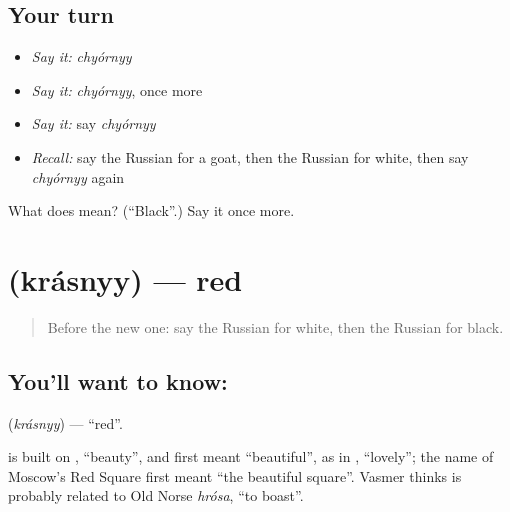 \subsection*{Your turn}
\begin{itemize}
\raggedright
  \item \emph{Say it:} \emph{chyórnyy}
  \item \emph{Say it:} \emph{chyórnyy}, once more
  \item \emph{Say it:} say \emph{chyórnyy}
  \item \emph{Recall:} say the Russian for a goat, then the Russian for white, then say \emph{chyórnyy} again
\end{itemize}

\begin{tcolorbox}[breakable,colback=teal!4,colframe=teal!35!black,title={Before you move on}]
What does  mean? (\textquotedblleft{}Black\textquotedblright{}.) Say it once more.
\end{tcolorbox}
\section[\texorpdfstring{\ru{красный} (krásnyy)}{красный (krásnyy)}]{ (krásnyy) — red}

\label{lesson:RU-C63-red}



\begin{quote}
Before the new one: say the Russian for white, then the Russian for black.
\end{quote}

\subsection*{You'll want to know: }
\textbf{} (\emph{krásnyy}) — \textquotedblleft{}red\textquotedblright{}.

\begin{cousinweb}
\textbf{} is built on \emph{}, \textquotedblleft{}beauty\textquotedblright{}, and first meant \textquotedblleft{}beautiful\textquotedblright{}, as in \emph{}, \textquotedblleft{}lovely\textquotedblright{}; the name of Moscow's Red Square first meant \textquotedblleft{}the beautiful square\textquotedblright{}. Vasmer thinks \emph{} is probably related to Old Norse \emph{hrósa}, \textquotedblleft{}to boast\textquotedblright{}.
\end{cousinweb}

